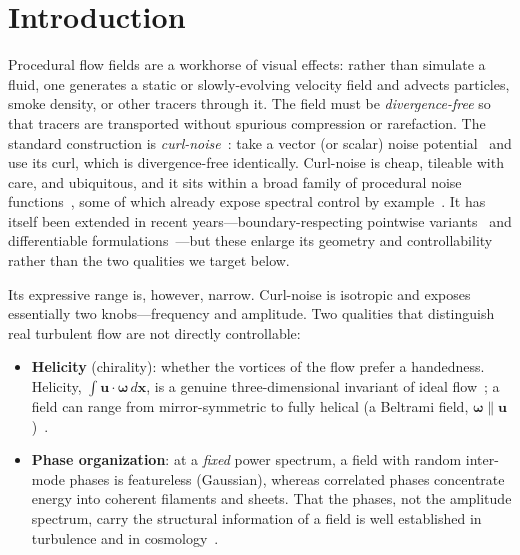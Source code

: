 \documentclass[11pt]{article}
\theoremstyle{remark}
\newcommand{\bx}{\mathbf{x}}
\newcommand{\bu}{\mathbf{u}}
\newcommand{\bomega}{\boldsymbol{\omega}}
\begin{document}
\section{Introduction}

Procedural flow fields are a workhorse of visual effects: rather than simulate a fluid, one
generates a static or slowly-evolving velocity field and advects particles, smoke density,
or other tracers through it. The field must be \emph{divergence-free} so that tracers are
transported without spurious compression or rarefaction. The standard construction is
\emph{curl-noise}~\cite{bridson2007}: take a vector (or scalar) noise
potential~\cite{perlin1985} and use its curl, which is divergence-free identically. Curl-noise
is cheap, tileable with care, and ubiquitous, and it sits within a broad family of procedural
noise functions~\cite{lagae2010}, some of which already expose spectral control by
example~\cite{galerne2012}. It has itself been extended in recent years---boundary-respecting
pointwise variants~\cite{chang2022} and differentiable formulations~\cite{ding2023}---but these
enlarge its geometry and controllability rather than the two qualities we target below.

Its expressive range is, however, narrow. Curl-noise is isotropic and exposes essentially two
knobs---frequency and amplitude. Two qualities that distinguish real turbulent flow are not
directly controllable:
\begin{itemize}[nosep]
\item \textbf{Helicity} (chirality): whether the vortices of the flow prefer a handedness.
Helicity, $\int \bu\cdot\bomega\,d\bx$, is a genuine three-dimensional invariant of ideal
flow~\cite{moffatt1969}; a field can range from mirror-symmetric to fully helical
(a Beltrami field, $\bomega\parallel\bu$)~\cite{constantin1988,dombre1986}.
\item \textbf{Phase organization}: at a \emph{fixed} power spectrum, a field with random
inter-mode phases is featureless (Gaussian), whereas correlated phases concentrate energy
into coherent filaments and sheets. That the phases, not the amplitude spectrum, carry the
structural information of a field is well established in turbulence and in
cosmology~\cite{coles2000}.
\end{itemize}
\end{document}
